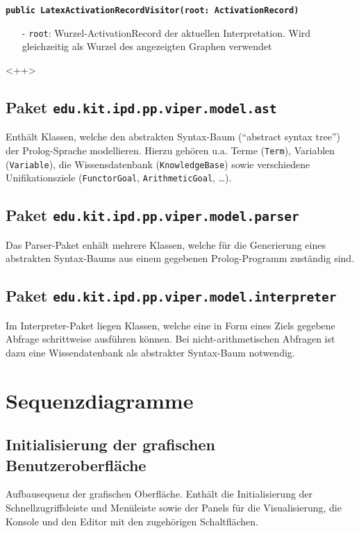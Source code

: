 \documentclass[parskip=full,11pt,twoside]{scrartcl}
\begin{document}
\textbf{\texttt{public LatexActivationRecordVisitor(root: ActivationRecord)}}\\
\begin{itemize}[noitemsep]
	\item[-] \texttt{root}: Wurzel-ActivationRecord der aktuellen Interpretation. Wird gleichzeitig als Wurzel des angezeigten Graphen verwendet
\end{itemize}
<++>

\subsection{Paket \texttt{edu.kit.ipd.pp.viper.model.ast}}

Enthält Klassen, welche den abstrakten Syntax-Baum (\enquote{abstract syntax tree}) der Prolog-Sprache modellieren. Hierzu gehören u.a. Terme (\texttt{Term}), Variablen (\texttt{Variable}), die Wissensdatenbank (\texttt{KnowledgeBase}) sowie verschiedene Unifikationsziele (\texttt{FunctorGoal}, \texttt{ArithmeticGoal}, \dots).

\subsection{Paket \texttt{edu.kit.ipd.pp.viper.model.parser}}

Das Parser-Paket enhält mehrere Klassen, welche für die Generierung eines abstrakten Syntax-Baums aus einem gegebenen Prolog-Programm zuständig sind.

\subsection{Paket \texttt{edu.kit.ipd.pp.viper.model.interpreter}}

Im Interpreter-Paket liegen Klassen, welche eine in Form eines Ziels gegebene Abfrage schrittweise ausführen können. Bei nicht-arithmetischen Abfragen ist dazu eine Wissendatenbank als abstrakter Syntax-Baum notwendig.

\section{Sequenzdiagramme}

\subsection{Initialisierung der grafischen Benutzeroberfläche}

Aufbausequenz der grafischen Oberfläche. Enthält die Initialisierung der Schnellzugriffsleiste und Menüleiste sowie der Panels für die Visualisierung, die Konsole und den Editor mit den zugehörigen Schaltflächen.
\end{document}
